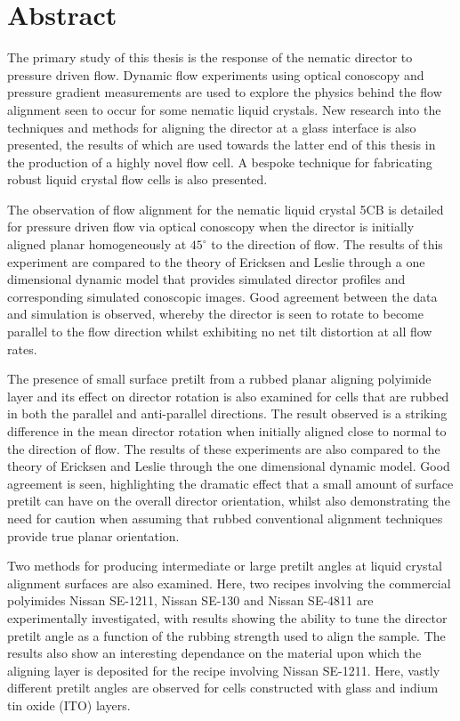 \chapter*{Abstract}
The primary study of this thesis is the response of the nematic director to pressure driven flow. Dynamic flow experiments using optical conoscopy and pressure gradient measurements are used to explore the physics behind the flow alignment seen to occur for some nematic liquid crystals. New research into the techniques and methods for aligning the director at a glass interface is also presented, the results of which are used towards the latter end of this thesis in the production of a highly novel flow cell. A bespoke technique for fabricating robust liquid crystal flow cells is also presented.

The observation of flow alignment for the nematic liquid crystal 5CB is detailed for pressure driven flow via optical conoscopy when the director is initially aligned planar homogeneously at $45^{\circ}$ to the direction of flow. The results of this experiment are compared to the theory of Ericksen and Leslie through a one dimensional dynamic model that provides simulated director profiles and corresponding simulated conoscopic images. Good agreement between the data and simulation is observed, whereby the director is seen to rotate to become parallel to the flow direction whilst exhibiting no net tilt distortion at all flow rates.

The presence of small surface pretilt from a rubbed planar aligning polyimide layer and its effect on director rotation is also examined for cells that are rubbed in both the parallel and anti-parallel directions. The result observed is a striking difference in the mean director rotation when initially aligned close to normal to the direction of flow. The results of these experiments are also compared to the theory of Ericksen and Leslie through the one dimensional dynamic model. Good agreement is seen, highlighting the dramatic effect that a small amount of surface pretilt can have on the overall director orientation, whilst also demonstrating the need for caution when assuming that rubbed conventional alignment techniques provide true planar orientation.

Two methods for producing intermediate or large pretilt angles at liquid crystal alignment surfaces are also examined. Here, two recipes involving the commercial polyimides Nissan SE-1211, Nissan SE-130 and Nissan SE-4811 are experimentally investigated, with results showing the ability to tune the director pretilt angle as a function of the rubbing strength used to align the sample. The results also show an interesting dependance on the material upon which the aligning layer is deposited for the recipe involving Nissan SE-1211. Here, vastly different pretilt angles are observed for cells constructed with glass and indium tin oxide (ITO) layers.

